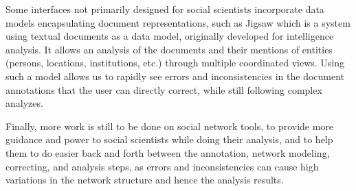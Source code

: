 Some interfaces not primarily designed for social scientists incorporate data models encapsulating document representations, such as Jigsaw \cite{staskoJigsawSupportingInvestigative2008} which is a \va system using textual documents as a data model, originally developed for intelligence analysis.
It allows an analysis of the documents and their mentions of entities (persons, locations, institutions, etc.) through multiple coordinated views.
Using such a model allows us to rapidly see errors and inconsistencies in the document annotations that the user can directly correct, while still following complex analyzes.

Finally, more work is still to be done on social network \va tools, to provide more guidance and power to social scientists while doing their analysis, and to help them to do easier back and forth between the annotation, network modeling, correcting, and analysis steps, as errors and inconsistencies can cause high variations in the network structure and hence the analysis results\cite{diesnerImpactEntityDisambiguation2015}.









%







